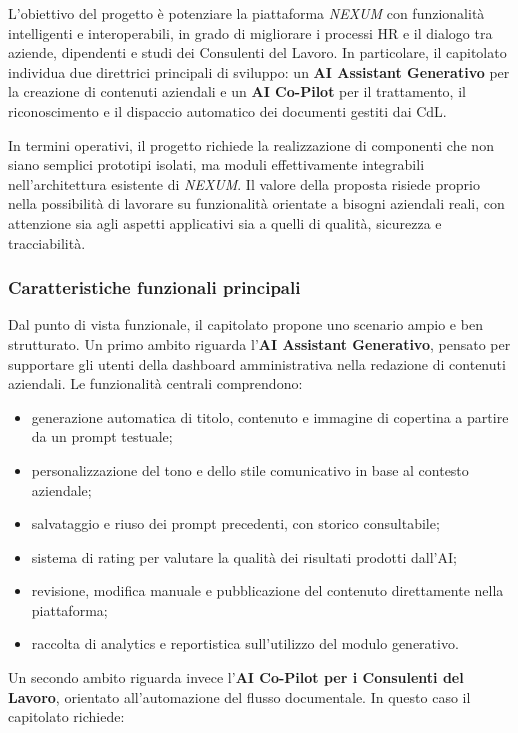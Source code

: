 \documentclass[a4paper,12pt]{article}
\begin{document}
L'obiettivo del progetto è potenziare la piattaforma \textit{NEXUM} con funzionalità intelligenti e interoperabili, in grado di migliorare i processi HR e il dialogo tra aziende, dipendenti e studi dei Consulenti del Lavoro. In particolare, il capitolato individua due direttrici principali di sviluppo: un \textbf{AI Assistant Generativo} per la creazione di contenuti aziendali e un \textbf{AI Co-Pilot} per il trattamento, il riconoscimento e il dispaccio automatico dei documenti gestiti dai CdL.

In termini operativi, il progetto richiede la realizzazione di componenti che non siano semplici prototipi isolati, ma moduli effettivamente integrabili nell'architettura esistente di \textit{NEXUM}. Il valore della proposta risiede proprio nella possibilità di lavorare su funzionalità orientate a bisogni aziendali reali, con attenzione sia agli aspetti applicativi sia a quelli di qualità, sicurezza e tracciabilità.

\subsubsection{Caratteristiche funzionali principali}

Dal punto di vista funzionale, il capitolato propone uno scenario ampio e ben strutturato. Un primo ambito riguarda l'\textbf{AI Assistant Generativo}, pensato per supportare gli utenti della dashboard amministrativa nella redazione di contenuti aziendali. Le funzionalità centrali comprendono:

\begin{itemize}
    \item generazione automatica di titolo, contenuto e immagine di copertina a partire da un prompt testuale;
    \item personalizzazione del tono e dello stile comunicativo in base al contesto aziendale;
    \item salvataggio e riuso dei prompt precedenti, con storico consultabile;
    \item sistema di rating per valutare la qualità dei risultati prodotti dall'AI;
    \item revisione, modifica manuale e pubblicazione del contenuto direttamente nella piattaforma;
    \item raccolta di analytics e reportistica sull'utilizzo del modulo generativo.
\end{itemize}

Un secondo ambito riguarda invece l'\textbf{AI Co-Pilot per i Consulenti del Lavoro}, orientato all'automazione del flusso documentale. In questo caso il capitolato richiede:
\end{document}
